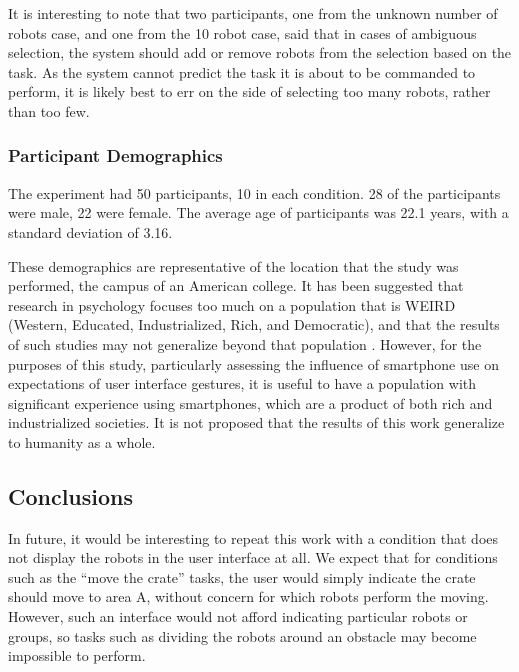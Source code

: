 It is interesting to note that two participants, one from the unknown number of robots case, and one from the 10 robot case, said that in cases of ambiguous selection, the system should add or remove robots from the selection based on the task. 
As the system cannot predict the task it is about to be commanded to perform, it is likely best to err on the side of selecting too many robots, rather than too few. 

\subsubsection{Participant Demographics} \label{section:Participant_Demographics}

The experiment had 50 participants, 10 in each condition. 28 of the participants were male, 22 were female. The average age of participants was 22.1 years, with a standard deviation of 3.16. 

These demographics are representative of the location that the study was performed, the campus of an American college. 
It has been suggested that research in psychology focuses too much on a population that is WEIRD (Western, Educated, Industrialized, Rich, and Democratic), and that the results of such studies may not generalize beyond that population \citep{arnett2008neglected}.
However, for the purposes of this study, particularly assessing the influence of smartphone use on expectations of user interface gestures, it is useful to have a population with significant experience using smartphones, which are a product of both rich and industrialized societies. 
It is not proposed that the results of this work generalize to humanity as a whole.  

\subsection{Conclusions} \label{section:Conclusions}

In future, it would be interesting to repeat this work with a condition that does not display the robots in the user interface at all. 
We expect that for conditions such as the ``move the crate'' tasks, the user would simply indicate the crate should move to area A, without concern for which robots perform the moving. 
However, such an interface would not afford indicating particular robots or groups, so tasks such as dividing the robots around an obstacle may become impossible to perform.

